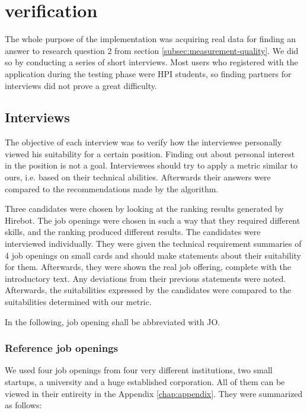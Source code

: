 \chapter{verification}\label{ch:verification}
The whole purpose of the implementation was acquiring real data for finding an answer to research question 2 from section \ref{subsec:measurement-quality}. We did so by conducting a series of short interviews. Most users who registered with the application during the testing phase were HPI students, so finding partners for interviews did not prove a great difficulty.

\section{Interviews}\label{sec:interviews}
The objective of each interview was to verify how the interviewee personally viewed his suitability for a certain position. Finding out about personal interest in the position is not a goal. Interviewees should try to apply a metric similar to ours, i.e. based on their technical abilities. Afterwards their answers were compared to the recommendations made by the algorithm.

Three candidates were chosen by looking at the ranking results generated by Hirebot. The job openings were chosen in such a way that they required different skills, and the ranking produced different results. The candidates were interviewed individually. They were given the technical requirement summaries of 4 job openings on small cards and should make statements about their suitability for them. Afterwards, they were shown the real job offering, complete with the introductory text. Any deviations from their previous statements were noted. Afterwards, the suitabilities expressed by the candidates were compared to the suitabilities determined with our metric.

In the following, job opening shall be abbreviated with JO.

\subsection{Reference job openings}
We used four job openings from four very different institutions, two small startups, a university and a huge established corporation. All of them can be viewed in their entireity in the Appendix \ref{chap:appendix}. They were summarized as follows:

